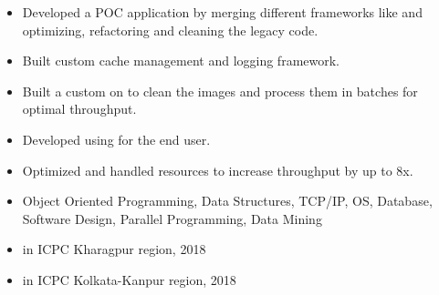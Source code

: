 \documentclass[10pt,a4paper,ragged2e, normalphoto]{altacv}
\begin{document}
\begin{itemize}
  \item Developed a POC application by merging different frameworks like and optimizing, refactoring and cleaning the legacy code.
  \item Built custom cache management and logging framework.
 \end{itemize}
\vspace{10pt}
\begin{itemize}
  \item Built a custom on to clean the images and process them in batches for optimal throughput.
  \item Developed using for the end user.
  \item Optimized and handled resources to increase throughput by up to 8x.
 \end{itemize}
 
 
\begin{itemize}
  \item {}Object Oriented Programming, Data Structures, TCP/IP, OS, Database, Software Design, Parallel Programming, Data Mining%
\end{itemize}


\begin{itemize}
    \item {}in ICPC Kharagpur region, 2018
    \item {}in ICPC Kolkata-Kanpur region, 2018
 \end{itemize}
\end{document}
